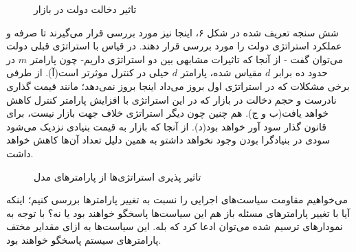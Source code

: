 \documentclass[13pt,onecolumn,a4paper]{article}
\begin{document}
	
	\begin{figure}[H]
	\centering
	\hfil
	
	\medskip
	\hfil
	
	\medskip
	\hfil
	\caption{تاثیر دخالت دولت در بازار}
	\label{fig:myfigure}
\end{figure}
شش سنجه تعریف شده در شکل ۶، اینجا نیز مورد بررسی قرار می‌گیرند تا صرفه و عملکرد استراتژی دولت را مورد بررسی قرار دهند. در قیاس با استراتژی قبلی دولت می‌توان گفت - از آنجا که تاثیرات مشابهی بین دو استراتژی داریم- چون پارامتر $m$ در حدود ده برابر $d$ مقیاس شده، پارامتر $d$ خیلی در کنترل موثرتر است(آ). از طرفی برخی مشکلات که در استراتژی اول بروز می‌داد اینجا بروز نمی‌دهد؛ مانند قیمت گذاری نادرست و حجم دخالت در بازار که در این استراتژی با افزایش پارامتر کنترل کاهش خواهد یافت(ب و ج). هم چنین چون دیگر استراتژی خلاف جهت بازار نیست، برای قانون گذار سود آور خواهد بود(د). از آنجا که بازار به قیمت بنیادی نزدیک می‌شود سودی در بنیادگرا بودن وجود نخواهد داشتو به همین دلیل تعداد آن‌ها کاهش خواهد داشت.






	\begin{figure}[H]
	\centering
	\hfil
	
	\medskip
	\hfil
	
	\medskip
	\hfil
	\caption{تاثیر پذیری استراتژی‌ها از پارامترهای مدل}
	\label{fig:myfigure}
\end{figure}
می‌خواهیم مقاومت سیاست‌های اجرایی را نسبت به تغییر پارامترها بررسی کنیم؛ اینکه آیا با تغییر پارامترهای مسئله باز هم این سیاست‌ها پاسخگو خواهند بود یا نه؟ با توجه به نمودارهای ترسیم شده می‌توان ادعا کرد که بله. این سیاست‌ها به ازای مقدایر مختف پارامترهای سیستم پاسخگو خواهند بود.
\end{document}
